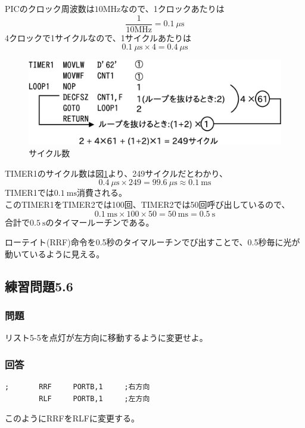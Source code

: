 \documentclass[a4paper,12pt]{ujarticle}
\begin{document}
  PICのクロック周波数は$10\si{\mega\hertz}$なので、1クロックあたりは
    \[
     \frac{1}{10\si{\mega\hertz}} = \SI{0.1}{\mu\second}
    \]
    4クロックで1サイクルなので、1サイクルあたりは
    \[
     \SI{0.1}{\mu\second} \times 4 = \SI{0.4}{\mu\second}
    \]
     \begin{figure}[htbp]
      \begin{center}
       \includegraphics[width=130mm]{Diagram5.eps}
      \end{center}
      \caption{サイクル数}
      \label{fig:sicle}
     \end{figure}
     TIMER1のサイクル数は図\ref{fig:sicle}より、249サイクルだとわかり、
     \[
      \SI{0.4}{\mu\second} \times 249 = \SI{99.6}{\mu\second} \approx \SI{0.1}{\milli\second}
     \]
     TIMER1では$\SI{0.1}{\milli\second}$消費される。\\
     このTIMER1をTIMER2では100回、TIMER2では50回呼び出しているので、
     \[
      \SI{0.1}{\milli\second} \times 100 \times 50 = \SI{50}{\milli\second} = \SI{0.5}{\second}
     \]
     合計で$\SI{0.5}{\second}$のタイマールーチンである。

     ローテイト(RRF)命令を0.5秒のタイマルーチンでび出すことで、0.5秒毎に光が動いているように見える。
  \subsection{練習問題5.6}
     \subsubsection{問題}
     リスト5-5を点灯が左方向に移動するように変更せよ。
     \subsubsection{回答}
  \begin{lstlisting}[basicstyle=\ttfamily\footnotesize, frame=single]
;       RRF     PORTB,1     ;右方向
        RLF     PORTB,1     ;左方向
  \end{lstlisting}
  このようにRRFをRLFに変更する。
\end{document}
